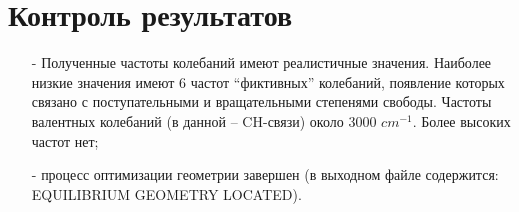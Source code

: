\section{Контроль результатов}
\begin{itemize}
    \item[-] Полученные частоты колебаний имеют реалистичные значения. Наиболее низкие значения имеют 6 частот “фиктивных” колебаний, появление которых связано с поступательными и вращательными степенями свободы. Частоты валентных колебаний (в данной -- CH-связи) около 3000 $cm^{-1}$. Более высоких частот нет;
    \item[-] процесс оптимизации геометрии завершен (в выходном файле содержится: EQUILIBRIUM GEOMETRY LOCATED). 
\end{itemize}{}